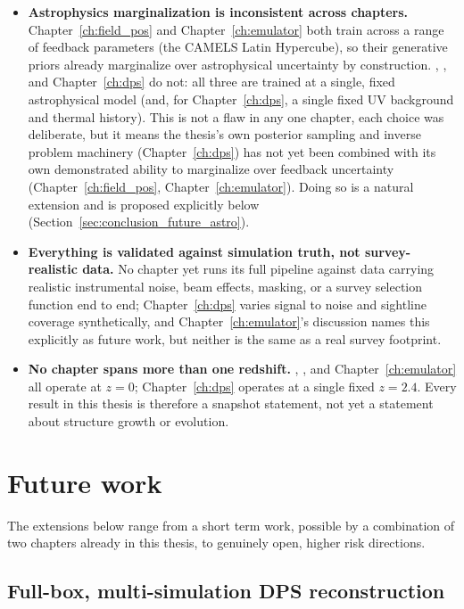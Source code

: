 \begin{itemize}
    \item \textbf{Astrophysics marginalization is inconsistent across chapters.} Chapter~\ref{ch:field_pos} and Chapter~\ref{ch:emulator} both train across a range of feedback parameters (the CAMELS Latin Hypercube), so their generative priors already marginalize over astrophysical uncertainty by construction. \LODI, \FOLD, and Chapter~\ref{ch:dps} do not: all three are trained at a single, fixed astrophysical model (and, for Chapter~\ref{ch:dps}, a single fixed UV background and thermal history). This is not a flaw in any one chapter, each choice was deliberate, but it means the thesis's own posterior sampling and inverse problem machinery (Chapter~\ref{ch:dps}) has not yet been combined with its own demonstrated ability to marginalize over feedback uncertainty (Chapter~\ref{ch:field_pos}, Chapter~\ref{ch:emulator}). Doing so is a natural extension and is proposed explicitly below (Section~\ref{sec:conclusion_future_astro}).
    \item \textbf{Everything is validated against simulation truth, not survey-realistic data.} No chapter yet runs its full pipeline against data carrying realistic instrumental noise, beam effects, masking, or a survey selection function end to end; Chapter~\ref{ch:dps} varies signal to noise and sightline coverage synthetically, and Chapter~\ref{ch:emulator}'s discussion names this explicitly as future work, but neither is the same as a real survey footprint.
    \item \textbf{No chapter spans more than one redshift.} \LODI, \FOLD, and Chapter~\ref{ch:emulator} all operate at $z=0$; Chapter~\ref{ch:dps} operates at a single fixed $z=2.4$. Every result in this thesis is therefore a snapshot statement, not yet a statement about structure growth or evolution.
\end{itemize}

\section{Future work}
\label{sec:conclusion_future}

The extensions below range from a short term work, possible by a  combination of two chapters already in this thesis, to genuinely open, higher risk directions. 

\subsection{Full-box, multi-simulation DPS reconstruction}
\label{sec:conclusion_future_fullbox}

